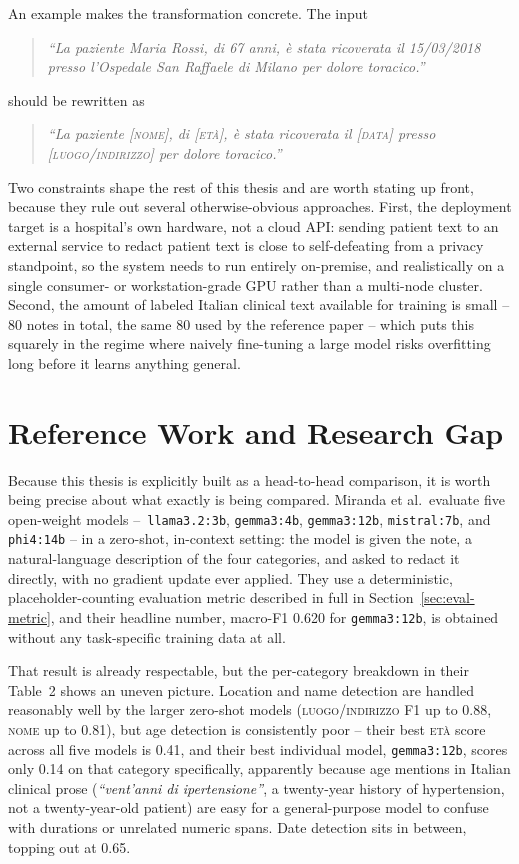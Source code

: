 \documentclass[12pt,a4paper]{report}
\newcommand{\NOME}{\textsc{nome}}
\newcommand{\ETA}{\textsc{et\`a}}
\newcommand{\DATA}{\textsc{data}}
\newcommand{\LUOGO}{\textsc{luogo\slash indirizzo}}
\begin{document}
An example makes the transformation concrete. The input

\begin{quote}
\itshape ``La paziente Maria Rossi, di 67 anni, è stata ricoverata il 15/03/2018 presso l'Ospedale San Raffaele di Milano per dolore toracico.''
\end{quote}

should be rewritten as

\begin{quote}
\itshape ``La paziente [\NOME], di [\ETA], è stata ricoverata il [\DATA] presso [\LUOGO] per dolore toracico.''
\end{quote}

Two constraints shape the rest of this thesis and are worth stating up front, because they rule out several otherwise-obvious approaches. First, the deployment target is a hospital's own hardware, not a cloud API: sending patient text to an external service to redact patient text is close to self-defeating from a privacy standpoint, so the system needs to run entirely on-premise, and realistically on a single consumer- or workstation-grade GPU rather than a multi-node cluster. Second, the amount of labeled Italian clinical text available for training is small -- 80 notes in total, the same 80 used by the reference paper -- which puts this squarely in the regime where naively fine-tuning a large model risks overfitting long before it learns anything general.

\section{Reference Work and Research Gap}

Because this thesis is explicitly built as a head-to-head comparison, it is worth being precise about what exactly is being compared. Miranda et al.\ evaluate five open-weight models --\ \texttt{llama3.2:3b}, \texttt{gemma3:4b}, \texttt{gemma3:12b}, \texttt{mistral:7b}, and \texttt{phi4:14b} -- in a zero-shot, in-context setting: the model is given the note, a natural-language description of the four categories, and asked to redact it directly, with no gradient update ever applied. They use a deterministic, placeholder-counting evaluation metric described in full in Section~\ref{sec:eval-metric}, and their headline number, macro-F1 0.620 for \texttt{gemma3:12b}, is obtained without any task-specific training data at all.

That result is already respectable, but the per-category breakdown in their Table~2 shows an uneven picture. Location and name detection are handled reasonably well by the larger zero-shot models (\LUOGO{} F1 up to 0.88, \NOME{} up to 0.81), but age detection is consistently poor -- their best \ETA{} score across all five models is 0.41, and their best individual model, \texttt{gemma3:12b}, scores only 0.14 on that category specifically, apparently because age mentions in Italian clinical prose (\emph{``vent'anni di ipertensione''}, a twenty-year history of hypertension, not a twenty-year-old patient) are easy for a general-purpose model to confuse with durations or unrelated numeric spans. Date detection sits in between, topping out at 0.65.
\end{document}
